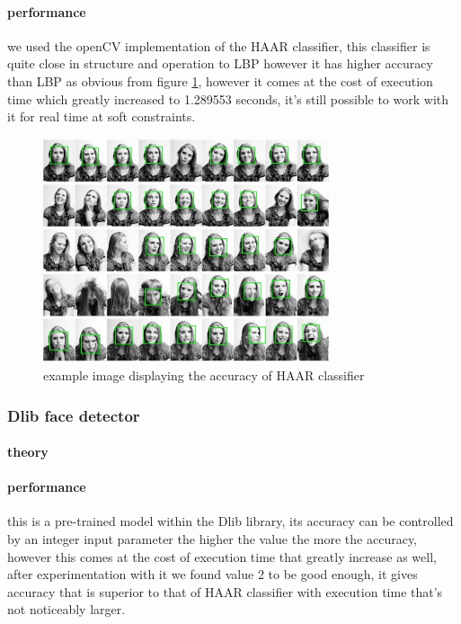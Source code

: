 \paragraph{performance}
we used the openCV implementation of the HAAR classifier, this classifier is quite close in structure and operation to LBP however it has higher accuracy than LBP as obvious from figure \ref{fig:haar_example}, however it comes at the cost of execution time which greatly increased to 1.289553 seconds, it's still possible to work with it for real time at soft constraints.
\begin{figure}
	\centering
	\includegraphics[width=0.75\textwidth]{images/haar_example.jpg}
	\caption{example image displaying the accuracy of HAAR classifier}
	\label{fig:haar_example}
\end{figure}

\subsubsection{Dlib face detector}
\paragraph{theory}
\paragraph{performance}
this is a pre-trained model within the Dlib library, its accuracy can be controlled by an integer input parameter the higher the value the more the accuracy, however this comes at the cost of execution time that greatly increase as well, after experimentation with it we found value 2 to be good enough, it gives accuracy that is superior to that of HAAR classifier with execution time that's not noticeably larger.


